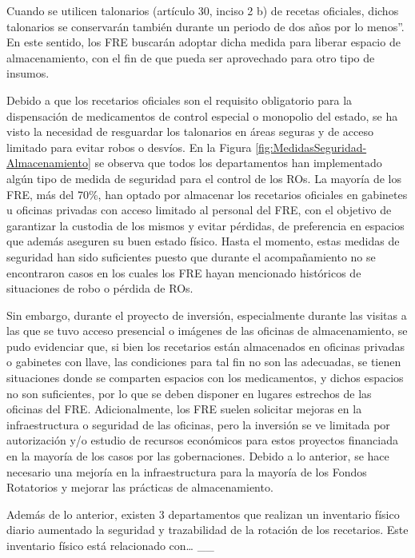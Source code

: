 \documentclass[
]{book}
\begin{document}
Cuando se utilicen talonarios (artículo 30, inciso 2 b) de recetas oficiales, dichos talonarios se conservarán también durante un periodo de dos años por lo menos''. En este sentido, los FRE buscarán adoptar dicha medida para liberar espacio de almacenamiento, con el fin de que pueda ser aprovechado para otro tipo de insumos.

Debido a que los recetarios oficiales son el requisito obligatorio para la dispensación de medicamentos de control especial o monopolio del estado, se ha visto la necesidad de resguardar los talonarios en áreas seguras y de acceso limitado para evitar robos o desvíos. En la Figura \ref{fig:MedidasSeguridad-Almacenamiento} se observa que todos los departamentos han implementado algún tipo de medida de seguridad para el control de los ROs. La mayoría de los FRE, más del 70\%, han optado por almacenar los recetarios oficiales en gabinetes u oficinas privadas con acceso limitado al personal del FRE, con el objetivo de garantizar la custodia de los mismos y evitar pérdidas, de preferencia en espacios que además aseguren su buen estado físico. Hasta el momento, estas medidas de seguridad han sido suficientes puesto que durante el acompañamiento no se encontraron casos en los cuales los FRE hayan mencionado históricos de situaciones de robo o pérdida de ROs.

Sin embargo, durante el proyecto de inversión, especialmente durante las visitas a las que se tuvo acceso presencial o imágenes de las oficinas de almacenamiento, se pudo evidenciar que, si bien los recetarios están almacenados en oficinas privadas o gabinetes con llave, las condiciones para tal fin no son las adecuadas, se tienen situaciones donde se comparten espacios con los medicamentos, y dichos espacios no son suficientes, por lo que se deben disponer en lugares estrechos de las oficinas del FRE. Adicionalmente, los FRE suelen solicitar mejoras en la infraestructura o seguridad de las oficinas, pero la inversión se ve limitada por autorización y/o estudio de recursos económicos para estos proyectos financiada en la mayoría de los casos por las gobernaciones. Debido a lo anterior, se hace necesario una mejoría en la infraestructura para la mayoría de los Fondos Rotatorios y mejorar las prácticas de almacenamiento.

Además de lo anterior, existen 3 departamentos que realizan un inventario físico diario aumentado la seguridad y trazabilidad de la rotación de los recetarios. Este inventario físico está relacionado con\ldots{} \_\_
\end{document}
